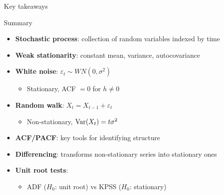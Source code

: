 \documentclass[9pt, aspectratio=169, t]{beamer}
\begin{document}
\begin{frame}{Key takeaways}
    \begin{block}{Summary}
    \small
    \begin{itemize}\setlength{\itemsep}{0pt}
        \item \textbf{Stochastic process}: collection of random variables indexed by time
        \item \textbf{Weak stationarity}: constant mean, variance, autocovariance
        \item \textbf{White noise}: $\varepsilon_t \sim WN(0, \sigma^2)$
        \begin{itemize}
            \item Stationary, ACF $= 0$ for $h \neq 0$
        \end{itemize}
        \item \textbf{Random walk}: $X_t = X_{t-1} + \varepsilon_t$
        \begin{itemize}
            \item Non-stationary, $\text{Var}(X_t) = t\sigma^2$
        \end{itemize}
        \item \textbf{ACF/PACF}: key tools for identifying structure
        \item \textbf{Differencing}: transforms non-stationary series into stationary ones
        \item \textbf{Unit root tests}:
        \begin{itemize}
            \item ADF ($H_0$: unit root) vs KPSS ($H_0$: stationary)
        \end{itemize}
    \end{itemize}
    \end{block}
\end{frame}
\end{document}

